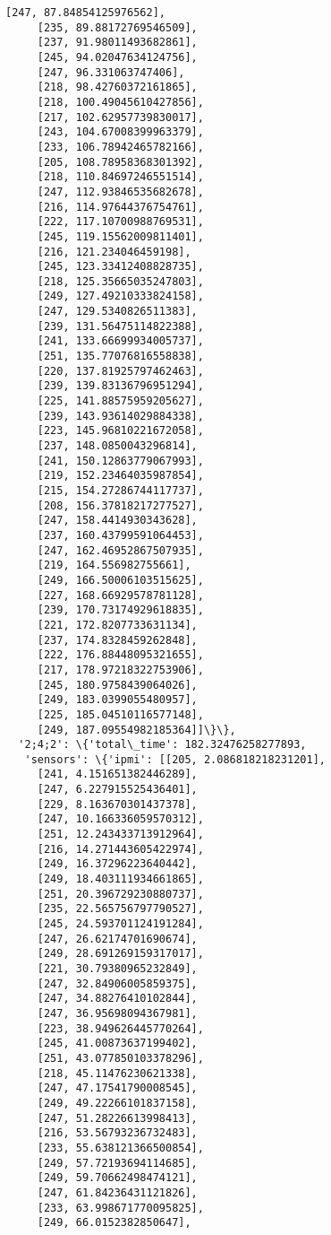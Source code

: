 \documentclass[11pt]{article}
\begin{document}
\begin{tcolorbox}[breakable, size=fbox, boxrule=.5pt, pad at break*=1mm, opacityfill=0]
\begin{Verbatim}[commandchars=\\\{\}]
     [247, 87.84854125976562],
     [235, 89.88172769546509],
     [237, 91.98011493682861],
     [245, 94.02047634124756],
     [247, 96.331063747406],
     [218, 98.42760372161865],
     [218, 100.49045610427856],
     [217, 102.62957739830017],
     [243, 104.67008399963379],
     [233, 106.78942465782166],
     [205, 108.78958368301392],
     [218, 110.84697246551514],
     [247, 112.93846535682678],
     [216, 114.97644376754761],
     [222, 117.10700988769531],
     [245, 119.15562009811401],
     [216, 121.234046459198],
     [245, 123.33412408828735],
     [218, 125.35665035247803],
     [249, 127.49210333824158],
     [247, 129.5340826511383],
     [239, 131.56475114822388],
     [241, 133.66699934005737],
     [251, 135.77076816558838],
     [220, 137.81925797462463],
     [239, 139.83136796951294],
     [225, 141.88575959205627],
     [239, 143.93614029884338],
     [223, 145.96810221672058],
     [237, 148.0850043296814],
     [241, 150.12863779067993],
     [219, 152.23464035987854],
     [215, 154.27286744117737],
     [208, 156.37818217277527],
     [247, 158.4414930343628],
     [237, 160.43799591064453],
     [247, 162.46952867507935],
     [219, 164.556982755661],
     [249, 166.50006103515625],
     [227, 168.66929578781128],
     [239, 170.73174929618835],
     [221, 172.8207733631134],
     [237, 174.8328459262848],
     [222, 176.88448095321655],
     [217, 178.97218322753906],
     [245, 180.9758439064026],
     [249, 183.0399055480957],
     [225, 185.04510116577148],
     [249, 187.09554982185364]]\}\},
  '2;4;2': \{'total\_time': 182.32476258277893,
   'sensors': \{'ipmi': [[205, 2.086818218231201],
     [241, 4.151651382446289],
     [247, 6.227915525436401],
     [229, 8.163670301437378],
     [247, 10.166336059570312],
     [251, 12.243433713912964],
     [216, 14.271443605422974],
     [249, 16.37296223640442],
     [249, 18.403111934661865],
     [251, 20.396729230880737],
     [235, 22.565756797790527],
     [245, 24.593701124191284],
     [247, 26.62174701690674],
     [249, 28.691269159317017],
     [221, 30.79380965232849],
     [247, 32.84906005859375],
     [247, 34.88276410102844],
     [247, 36.95698094367981],
     [223, 38.949626445770264],
     [245, 41.00873637199402],
     [251, 43.077850103378296],
     [218, 45.11476230621338],
     [247, 47.17541790008545],
     [249, 49.22266101837158],
     [247, 51.28226613998413],
     [216, 53.56793236732483],
     [233, 55.638121366500854],
     [249, 57.72193694114685],
     [249, 59.70662498474121],
     [247, 61.84236431121826],
     [233, 63.998671770095825],
     [249, 66.0152382850647],

\end{Verbatim}
\end{tcolorbox}
\end{document}
